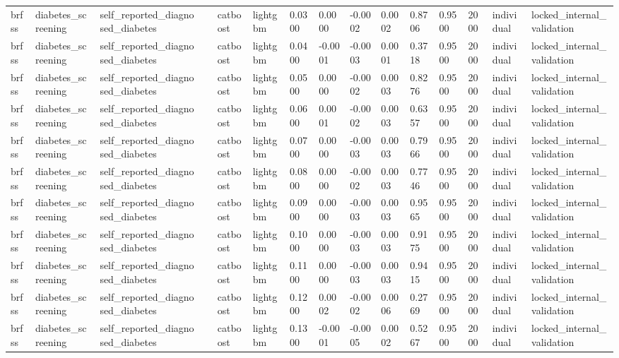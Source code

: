 \begin{tabular}{lllllllllllllll}
brfss & diabetes\_screening & self\_reported\_diagnosed\_diabetes &  & catboost & lightgbm & 0.0300 & 0.0000 & -0.0002 & 0.0002 & 0.8706 & 0.9500 & 2000 & individual & locked\_internal\_validation \\
brfss & diabetes\_screening & self\_reported\_diagnosed\_diabetes &  & catboost & lightgbm & 0.0400 & -0.0001 & -0.0003 & 0.0001 & 0.3718 & 0.9500 & 2000 & individual & locked\_internal\_validation \\
brfss & diabetes\_screening & self\_reported\_diagnosed\_diabetes &  & catboost & lightgbm & 0.0500 & 0.0000 & -0.0002 & 0.0003 & 0.8276 & 0.9500 & 2000 & individual & locked\_internal\_validation \\
brfss & diabetes\_screening & self\_reported\_diagnosed\_diabetes &  & catboost & lightgbm & 0.0600 & 0.0001 & -0.0002 & 0.0003 & 0.6357 & 0.9500 & 2000 & individual & locked\_internal\_validation \\
brfss & diabetes\_screening & self\_reported\_diagnosed\_diabetes &  & catboost & lightgbm & 0.0700 & 0.0000 & -0.0003 & 0.0003 & 0.7966 & 0.9500 & 2000 & individual & locked\_internal\_validation \\
brfss & diabetes\_screening & self\_reported\_diagnosed\_diabetes &  & catboost & lightgbm & 0.0800 & 0.0000 & -0.0002 & 0.0003 & 0.7746 & 0.9500 & 2000 & individual & locked\_internal\_validation \\
brfss & diabetes\_screening & self\_reported\_diagnosed\_diabetes &  & catboost & lightgbm & 0.0900 & 0.0000 & -0.0003 & 0.0003 & 0.9565 & 0.9500 & 2000 & individual & locked\_internal\_validation \\
brfss & diabetes\_screening & self\_reported\_diagnosed\_diabetes &  & catboost & lightgbm & 0.1000 & 0.0000 & -0.0003 & 0.0003 & 0.9175 & 0.9500 & 2000 & individual & locked\_internal\_validation \\
brfss & diabetes\_screening & self\_reported\_diagnosed\_diabetes &  & catboost & lightgbm & 0.1100 & 0.0000 & -0.0003 & 0.0003 & 0.9415 & 0.9500 & 2000 & individual & locked\_internal\_validation \\
brfss & diabetes\_screening & self\_reported\_diagnosed\_diabetes &  & catboost & lightgbm & 0.1200 & 0.0002 & -0.0002 & 0.0006 & 0.2769 & 0.9500 & 2000 & individual & locked\_internal\_validation \\
brfss & diabetes\_screening & self\_reported\_diagnosed\_diabetes &  & catboost & lightgbm & 0.1300 & -0.0001 & -0.0005 & 0.0002 & 0.5267 & 0.9500 & 2000 & individual & locked\_internal\_validation \\

\end{tabular}
